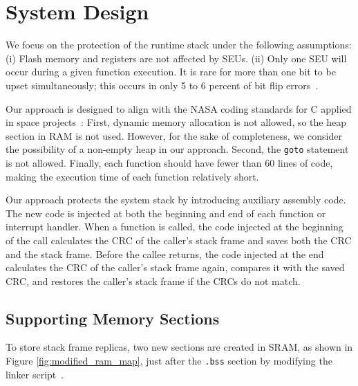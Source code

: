 \section{System Design}\label{sec:design}
We focus on the protection of the runtime stack under the following assumptions: (i) Flash memory and registers are not affected by SEUs. (ii) Only one SEU will occur during a given function execution. It is rare for more than one bit to be upset simultaneously; this occurs in only 5 to 6 percent of bit flip errors~\cite{underwood1992sramorbit}. 

Our approach is designed to align with the NASA coding standards for C applied in space projects~\cite{nasa_coding_standard}: First, dynamic memory allocation is not allowed, so the heap section in RAM is not used. However, for the sake of completeness, we consider the possibility of a non-empty heap in our approach. Second, the \texttt{goto} statement is not allowed. Finally, each function should have fewer than 60 lines of code, making the execution time of each function relatively short.

Our approach protects the system stack by introducing auxiliary assembly code. The new code is injected at both the beginning and end of each function or interrupt handler. When a function is called, the code injected at the beginning of the call calculates the CRC of the caller's stack frame and saves both the CRC and the stack frame. Before the callee returns, the code injected at the end calculates the CRC of the caller's stack frame again, compares it with the saved CRC, and restores the caller's stack frame if the CRCs do not match. 
\subsection{Supporting Memory Sections}\label{sec:memory_sections}
To store stack frame replicas, two new sections are created in SRAM, as shown in Figure \ref{fig:modified_ram_map}, just after the \texttt{.bss} section by modifying the linker script~\cite{linkerscript}. 

